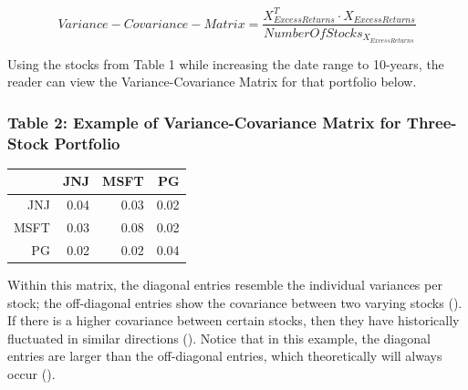 \documentclass[12pt,english]{article}
\begin{document}
\begin{doublespace}
                \begin{center}
                    \begin{equation} \label{Variance-Covariance-Matrix}
                        Variance-Covariance-Matrix = 
                        \frac{X^{T}_{Excess Returns} \cdot X_{Excess Returns}}
                        {Number Of Stocks_{X_{Excess Returns}}} 
                    \end{equation}
               \end{center}
            
            \indent{}\indent{}
        	Using the stocks from Table 1 while increasing the date range to 10-years, the reader can view the Variance-Covariance Matrix for that portfolio below.
            
                
                \subsubsection{Table 2: Example of Variance-Covariance Matrix for Three-Stock Portfolio} 
                        \begin{table}[H]
                        \centering
                        \begin{tabular}{rrrr}
                          \hline
                         & JNJ & MSFT & PG \\ 
                          \hline
                        JNJ & 0.04 & 0.03 & 0.02 \\ 
                          MSFT & 0.03 & 0.08 & 0.02 \\ 
                          PG & 0.02 & 0.02 & 0.04 \\ 
                           \hline
                        \end{tabular}
                        \end{table}
                    
                \indent{}
            	Within this matrix, the diagonal entries resemble the individual variances per stock; the off-diagonal entries show the covariance between two varying stocks (\citet{Simon2008}). If there is a higher covariance between certain stocks, then they have historically fluctuated in similar directions (\citet{Simon2008}). Notice that in this example, the diagonal entries are larger than the off-diagonal entries, which theoretically will always occur (\citet{Simon2008}). 


\end{doublespace}
\end{document}
